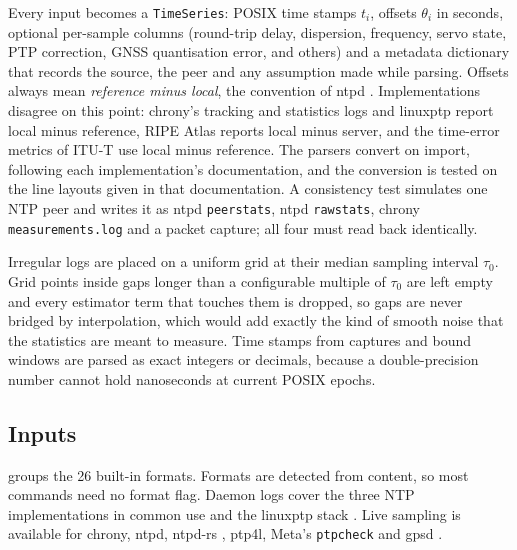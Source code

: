 \documentclass[11pt,a4paper]{article}
\begin{document}
Every input becomes a \texttt{TimeSeries}: POSIX time stamps $t_i$, offsets $\theta_i$ in seconds,
optional per-sample columns (round-trip delay, dispersion, frequency, servo state, PTP correction,
GNSS quantisation error, and others) and a metadata dictionary that records the source, the peer and
any assumption made while parsing. Offsets always mean \emph{reference minus local}, the convention of
ntpd \citep{rfc5905}. Implementations disagree on this point: chrony's tracking and statistics logs and
linuxptp report local minus reference, RIPE Atlas reports local minus server, and the time-error
metrics of ITU-T use local minus reference. The parsers convert on import, following each
implementation's documentation, and the conversion is tested on the line layouts given in that
documentation. A consistency test simulates one NTP peer and writes it as ntpd \texttt{peerstats},
ntpd \texttt{rawstats}, chrony \texttt{measurements.log} and a packet capture; all four must read back
identically.

Irregular logs are placed on a uniform grid at their median sampling interval $\tau_0$. Grid points
inside gaps longer than a configurable multiple of $\tau_0$ are left empty and every estimator term
that touches them is dropped, so gaps are never bridged by interpolation, which would add exactly the
kind of smooth noise that the statistics are meant to measure. Time stamps from captures and bound
windows are parsed as exact integers or decimals, because a double-precision number cannot hold
nanoseconds at current POSIX epochs.

\subsection{Inputs}

 groups the 26 built-in formats. Formats are detected from content, so most
commands need no format flag. Daemon logs cover the three NTP implementations in common use and the
linuxptp stack \citep{chrony,linuxptp,cochran2011}. Live sampling is available for chrony, ntpd,
ntpd-rs \citep{ntpdrs}, ptp4l, Meta's \texttt{ptpcheck} \citep{fbtime} and gpsd \citep{gpsd}.
\end{document}
